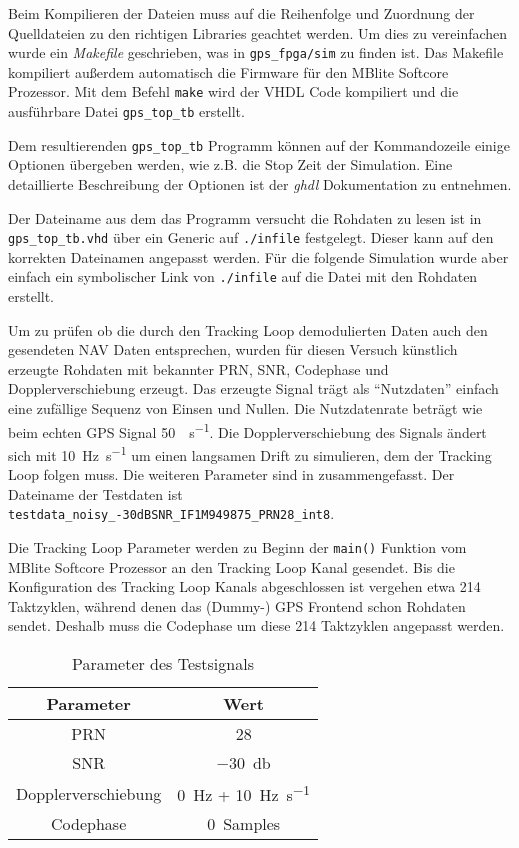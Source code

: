 Beim Kompilieren der Dateien muss auf die Reihenfolge und Zuordnung der Quelldateien zu den richtigen Libraries geachtet werden. Um dies zu vereinfachen wurde ein \emph{Makefile} geschrieben, was in \lstinline$gps_fpga/sim$ zu finden ist. Das Makefile kompiliert außerdem automatisch die Firmware für den MBlite Softcore Prozessor. Mit dem Befehl \lstinline$make$ wird der VHDL Code kompiliert und die ausführbare Datei \lstinline$gps_top_tb$ erstellt.

Dem resultierenden \lstinline$gps_top_tb$ Programm können auf der Kommandozeile einige Optionen übergeben werden, wie z.B. die Stop Zeit der Simulation. Eine detaillierte Beschreibung der Optionen ist der \emph{ghdl} Dokumentation zu entnehmen.

Der Dateiname aus dem das Programm versucht die Rohdaten zu lesen ist in \lstinline$gps_top_tb.vhd$ über ein Generic auf \lstinline$./infile$ festgelegt. Dieser kann auf den korrekten Dateinamen angepasst werden. Für die folgende Simulation wurde aber einfach ein symbolischer Link von \lstinline$./infile$ auf die Datei mit den Rohdaten erstellt.

Um zu prüfen ob die durch den Tracking Loop demodulierten Daten auch den gesendeten NAV Daten entsprechen, wurden für diesen Versuch künstlich erzeugte Rohdaten mit bekannter PRN, SNR, Codephase und Dopplerverschiebung erzeugt. Das erzeugte Signal trägt als \enquote{Nutzdaten} einfach eine zufällige Sequenz von Einsen und Nullen. Die Nutzdatenrate beträgt wie beim echten GPS Signal \SI{50}{\bit\per\second}. Die Dopplerverschiebung des Signals ändert sich mit \SI{10}{\hertz\per\second} um einen langsamen Drift zu simulieren, dem der Tracking Loop folgen muss. Die weiteren Parameter sind in  zusammengefasst. Der Dateiname der Testdaten ist \lstinline[language={}]$testdata_noisy_-30dBSNR_IF1M949875_PRN28_int8$.

Die Tracking Loop Parameter werden zu Beginn der \lstinline$main()$ Funktion vom MBlite Softcore Prozessor an den Tracking Loop Kanal gesendet. Bis die Konfiguration des Tracking Loop Kanals abgeschlossen ist vergehen etwa 214 Taktzyklen, während denen das (Dummy-) GPS Frontend schon Rohdaten sendet. Deshalb muss die Codephase um diese 214 Taktzyklen angepasst werden.

\begin{table}[htbp]
    \ttabbox
    {
        \caption[Testsignal Parameter]{Parameter des Testsignals}
        \label{TrackingVersuchTestsignalParameter}
    }
    {
    \begin{tabular}{c c}
        \toprule
        Parameter               & Wert \\
        \midrule
        PRN	                    & \num{28} \\
        SNR               & \SI{-30}{\decibel} \\
        Dopplerverschiebung     & \SI{0}{\hertz} + \SI{10}{\hertz\per\second}\\
        Codephase               & \SI{0}{Samples} \\
        \bottomrule
    \end{tabular}
}
\end{table}


